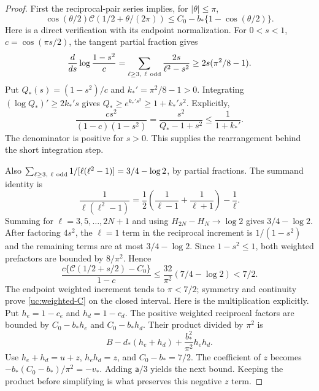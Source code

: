 \begin{proof}
First the reciprocal-pair series implies, for $|\theta|\leq\pi$,
\begin{equation}\label{uc:weighted-C}
 \cos(\theta/2)\mathcal C(1/2+\theta/(2\pi))
       \leq C_0-b_*\{1-\cos(\theta/2)\}.
\end{equation}
Here is a direct verification with its endpoint normalization.
For $0<s<1$, $c=\cos(\pi s/2)$, the tangent partial fraction gives
\[
 \frac{d}{ds}\log\frac{1-s^2}{c}
 =\sum_{\ell\geq3,\ \ell\ {\rm odd}}\frac{2s}{\ell^2-s^2}
 \geq2s(\pi^2/8-1).
\]
Put $Q_*(s)=(1-s^2)/c$ and $k_*'=\pi^2/8-1>0$. Integrating
$(\log Q_*)'\geq2k_*'s$ gives $Q_*\geq e^{k_*'s^2}\geq1+k_*'s^2$.
Explicitly,
\[
 \frac{cs^2}{(1-c)(1-s^2)}
 =\frac{s^2}{Q_*-1+s^2}\leq\frac1{1+k_*'}.
\]
The denominator is positive for $s>0$. This supplies the
rearrangement behind the short integration step.

Also $\sum_{\ell\geq3,\ \ell\ {\rm odd}}1/[\ell(\ell^2-1)]
=3/4-\log2$, by partial fractions. The summand identity is
\[
 \frac1{\ell(\ell^2-1)}
 =\frac12\left(\frac1{\ell-1}+\frac1{\ell+1}\right)-\frac1\ell.
\]
Summing for $\ell=3,5,\ldots,2N+1$ and using
$H_{2N}-H_N\to\log2$ gives $3/4-\log2$. After factoring $4s^2$, the $\ell=1$ term in the reciprocal
increment is $1/(1-s^2)$ and the remaining terms are at most
$3/4-\log2$. Since $1-s^2\leq1$, both weighted prefactors are
bounded by $8/\pi^2$. Hence
\[
 \frac{c\{\mathcal C(1/2+s/2)-C_0\}}{1-c}
       \leq\frac{32}{\pi^2}(7/4-\log2)<7/2.
\]
The endpoint weighted increment tends to $\pi<7/2$; symmetry and
continuity prove \eqref{uc:weighted-C} on the closed interval.
Here is the multiplication explicitly. Put $h_e=1-c_e$ and
$h_d=1-c_d$. The positive weighted reciprocal factors are bounded by
$C_0-b_*h_e$ and $C_0-b_*h_d$. Their product divided by $\pi^2$
is
\[
 B-d_*(h_e+h_d)+\frac{b_*^2}{\pi^2}h_eh_d.
\]
Use $h_e+h_d=u+z$, $h_eh_d=z$, and $C_0-b_*=7/2$. The coefficient
of $z$ becomes $-b_*(C_0-b_*)/\pi^2=-v_*$. Adding $\mathsf{a}/3$
yields the next bound. Keeping the product before simplifying is what
preserves this negative $z$ term.


\end{proof}
